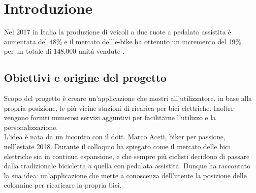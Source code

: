 
%

\chapter{Introduzione}
	Nel 2017 in Italia la produzione di veicoli a due ruote a pedalata assistita è aumentata
	del 48\% e il mercato dell'e-bike ha ottenuto un incremento del 
	19\%  per un totale di 148.000 unità vendute
	\cite{1}.   
	\section{Obiettivi e origine del progetto}
	Scopo del progetto è creare un’applicazione che mostri all’utilizzatore, in
	base  alla propria posizione, le più vicine stazioni di ricarica per bici
	elettriche. Inoltre vengono forniti numerosi servizi agguntivi per
	facilitarne l'utilizzo e la personalizzazione.\\
	L'idea è nata da un incontro con il dott. Marco Aceti, biker per passione,
	nell'estate 2018. Durante il colloquio ha spiegato come il mercato delle
	bici elettriche sia in continua espansione, e che sempre più ciclisti
	decidono di passare dalla tradizionale bicicletta a quella con pedalata
	assistita. Dunque ha raccontato la sua idea: un'applicazione che mette a
	conoscenza dell'utente la posizione delle colonnine per ricaricare la
	propria bici.
	
